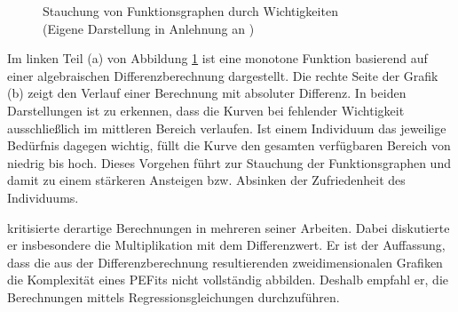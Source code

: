 \begin{figure}[h]
	\centering
	
	
	\caption[Stauchung von Funktionsgraphen durch Wichtigkeiten]{Stauchung von Funktionsgraphen durch Wichtigkeiten\\
	(Eigene Darstellung in Anlehnung an \cite[S. 1305]{locke:1976})}
	\label{fig:personEnvironmentFit:wichtigkeiten:abb1}
\end{figure}

Im linken Teil (a) von Abbildung \ref{fig:personEnvironmentFit:wichtigkeiten:abb1} ist eine monotone Funktion basierend auf einer algebraischen Differenzberechnung dargestellt. Die rechte Seite der Grafik (b) zeigt den Verlauf einer Berechnung mit absoluter Differenz. In beiden Darstellungen ist zu erkennen, dass die Kurven bei fehlender Wichtigkeit ausschließlich im mittleren Bereich verlaufen. Ist einem Individuum das jeweilige Bedürfnis dagegen wichtig, füllt die Kurve den gesamten verfügbaren Bereich von niedrig bis hoch. Dieses Vorgehen führt zur Stauchung der Funktionsgraphen und damit zu einem stärkeren Ansteigen bzw. Absinken der Zufriedenheit des Individuums. 

\textcite[S. 51ff.]{edwards:1991}\cite[S. 9ff.]{edwards:1990}\cite[S. 2ff.]{edwards:1993}\cite[S. 2ff.]{edwards:1993b} kritisierte derartige Berechnungen in mehreren seiner Arbeiten. Dabei diskutierte er insbesondere die Multiplikation mit dem Differenzwert. Er ist der Auffassung, dass die aus der Differenzberechnung resultierenden zweidimensionalen Grafiken die Komplexität eines \acp{PEFit} nicht vollständig abbilden. Deshalb empfahl er, die Berechnungen mittels Regressionsgleichungen durchzuführen.%


